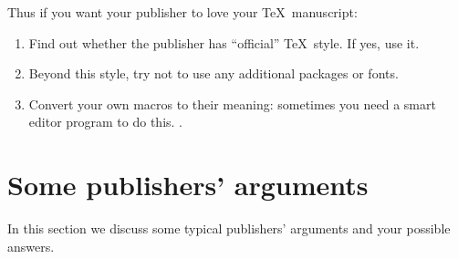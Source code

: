 \documentclass{article}
\begin{document}
Thus if you want your publisher to love your \TeX\ manuscript:
\begin{enumerate}
\item Find out whether the publisher has ``official'' \TeX\ style.  If
  yes, use it.
\item Beyond this style, try not to use any additional packages or fonts.
\item Convert your own macros to their meaning: sometimes you need a
  smart editor program to do this.  . 
\end{enumerate}

\section{Some publishers' arguments}
\label{sec:arguments}

In this section we discuss some typical publishers' arguments and your
possible answers.  



\end{document}
